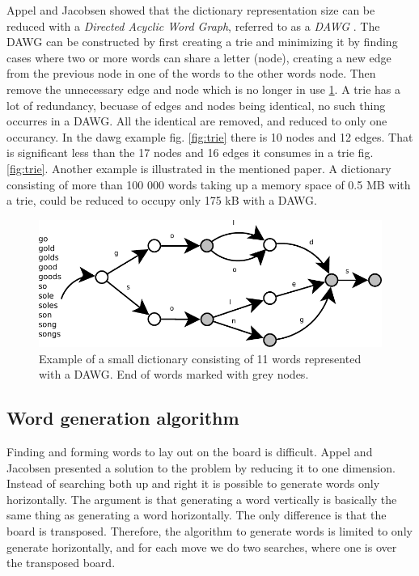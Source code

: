 \documentclass[a4paper, 12pt]{report}
\begin{document}
Appel and Jacobsen showed that the dictionary representation size can be reduced with a \emph{Directed Acyclic Word Graph}, referred to as a \emph{DAWG} \cite{fastest}. The DAWG can be constructed by first creating a trie and minimizing it by finding cases where two or more words can share a letter (node), creating a new edge from the previous node in one of the words to the other words node. Then remove the unnecessary edge and node which is no longer in use \ref{fig:dawg}. A trie has a lot of redundancy, becuase of edges and nodes being identical, no such thing occurres in a DAWG. All the identical are removed, and reduced to only one occurancy. In the dawg example fig. \ref{fig:trie} there is 10 nodes and 12 edges. That is significant less than the 17 nodes and 16 edges it consumes in a trie fig. \ref{fig:trie}. Another example is illustrated in the mentioned paper. A dictionary consisting of more than 100 000 words taking up a memory space of 0.5 MB with a trie, could be reduced to occupy only 175 kB with a DAWG.

\begin{figure}[h]
\centering
\includegraphics[scale=1]{dawg}
\caption{Example of a small dictionary consisting of 11 words represented with a DAWG. End of words marked with grey nodes.}
\label{fig:dawg}
\end{figure}

\subsection{Word generation algorithm}
Finding and forming words to lay out on the board is difficult. Appel and Jacobsen presented a solution to the problem by reducing it to one dimension. Instead of searching both up and right it is possible to generate words only horizontally. The argument is that generating a word vertically is basically the same thing as generating a word horizontally. The only difference is that the board is transposed. Therefore, the algorithm to generate words is limited to only generate horizontally, and for each move we do two searches, where one is over the transposed board. \cite{fastest}
\end{document}
